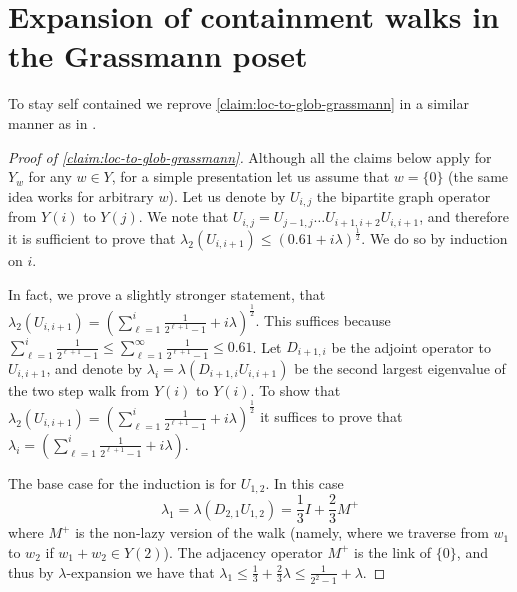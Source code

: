 \documentclass[10pt,a4paper]{article}
\newcommand{\prettyref}[1]{\cref{#1}}
\theoremstyle{definition}
\theoremstyle{remark}
\newtheorem{claim}[theorem]{Claim}
\newcommand{\set}[1]{\{#1\}}
\renewcommand{\leq}{\leqslant}
\numberwithin{equation}{section}
\let\pref=\prettyref
\def\Y{Y}
\def\diml{d}
\begin{document}
\section{Expansion of containment walks in the Grassmann poset} \label{app:grassmann-containment}
To stay self contained we reprove \pref{claim:loc-to-glob-grassmann} in a similar manner as in \cite{DiksteinDFH2018}.
\begin{proof}[Proof of \pref{claim:loc-to-glob-grassmann}]
    Although all the claims below apply for \(Y_w\) for any \(w \in Y\), for a simple presentation let us assume that \(w = \set{0}\) (the same idea works for arbitrary \(w\)). Let us denote by \(U_{i,j}\) the bipartite graph operator from \(\Y(i)\) to \(\Y(j)\). We note that \(U_{i,j} = U_{j-1,j} \dots U_{i+1,i+2} U_{i,i+1}\), and therefore it is sufficient to prove that \(\lambda_2(U_{i,i+1}) \leq \left (0.61 + i \lambda \right )^{\frac{1}{2}}\). We do so by induction on \(i\).

    In fact, we prove a slightly stronger statement, that \(\lambda_2(U_{i,i+1}) = \left (\sum_{\ell=1}^i \frac{1}{2^{\ell+1}-1} + i \lambda \right )^{\frac{1}{2}}\). This suffices because \(\sum_{\ell=1}^i \frac{1}{2^{\ell+1}-1} \leq \sum_{\ell=1}^\infty \frac{1}{2^{\ell+1}-1} \leq 0.61\). %
    Let \(D_{i+1,i}\) be the adjoint operator to \(U_{i,i+1}\), and denote by \(\lambda_i = \lambda(D_{i+1,i}U_{i,i+1})\) be the second largest eigenvalue of the two step walk from \(\Y(i)\) to \(\Y(i)\). To show that \(\lambda_2(U_{i,i+1}) = \left (\sum_{\ell=1}^i \frac{1}{2^{\ell+1}-1} + i \lambda \right )^{\frac{1}{2}}\) it suffices to prove that \(\lambda_i = \left (\sum_{\ell=1}^i \frac{1}{2^{\ell+1}-1} + i \lambda \right )\).

    The base case for the induction is for \(U_{1,2}\). In this case
    \[\lambda_1 = \lambda(D_{2,1} U_{1,2}) = \frac{1}{3}I + \frac{2}{3}M^+\]
    where \(M^+\) is the non-lazy version of the walk (namely, where we traverse from \(w_1\) to \(w_2\) if \(w_1 +w_2 \in \Y(2)\)). The adjacency operator \(M^+\) is the link of \(\set{0}\), and thus by \(\lambda\)-expansion we have that \(\lambda_1 \leq \frac{1}{3} + \frac{2}{3} \lambda \leq \frac{1}{2^2-1} + \lambda\).


\end{proof}
\end{document}
